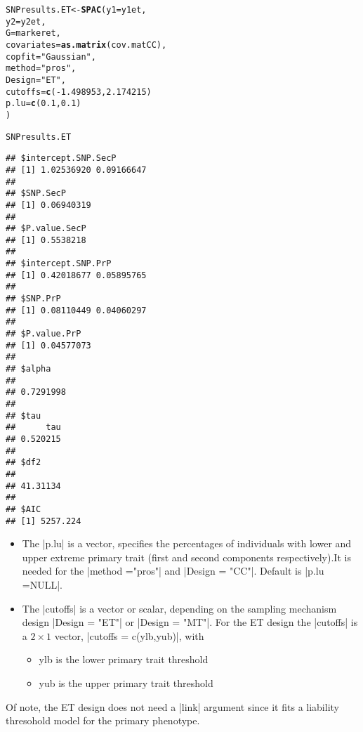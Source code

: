 \documentclass{article}\usepackage[]{graphicx}\usepackage[]{color}
\makeatletter
\newcommand{\hlnum}[1]{\textcolor[rgb]{0.686,0.059,0.569}{#1}}%
\newcommand{\hlstr}[1]{\textcolor[rgb]{0.192,0.494,0.8}{#1}}%
\newcommand{\hlopt}[1]{\textcolor[rgb]{0,0,0}{#1}}%
\newcommand{\hlstd}[1]{\textcolor[rgb]{0.345,0.345,0.345}{#1}}%
\newcommand{\hlkwb}[1]{\textcolor[rgb]{0.69,0.353,0.396}{#1}}%
\newcommand{\hlkwc}[1]{\textcolor[rgb]{0.333,0.667,0.333}{#1}}%
\newcommand{\hlkwd}[1]{\textcolor[rgb]{0.737,0.353,0.396}{\textbf{#1}}}%
\newenvironment{kframe}{%
 \def\at@end@of@kframe{}%
 \ifinner\ifhmode%
  \def\at@end@of@kframe{\end{minipage}}%
  \begin{minipage}{\columnwidth}%
 \fi\fi%
 \def\FrameCommand##1{\hskip\@totalleftmargin \hskip-\fboxsep
 \colorbox{shadecolor}{##1}\hskip-\fboxsep
     \hskip-\linewidth \hskip-\@totalleftmargin \hskip\columnwidth}%
 \MakeFramed {\advance\hsize-\width
   \@totalleftmargin\z@ \linewidth\hsize
   \@setminipage}}%
 {\par\unskip\endMakeFramed%
 \at@end@of@kframe}
\newenvironment{knitrout}{}{} %
\makeatother
\begin{document}
\begin{knitrout}
\color{fgcolor}\begin{kframe}
\begin{alltt}
\hlstd{SNPresults.ET} \hlkwb{<-} \hlkwd{SPAC}\hlstd{(}\hlkwc{y1} \hlstd{= y1et,}
                   \hlkwc{y2} \hlstd{= y2et,}
                   \hlkwc{G} \hlstd{= markeret,}
                   \hlkwc{covariates} \hlstd{=} \hlkwd{as.matrix}\hlstd{(cov.matCC),}
                   \hlkwc{copfit} \hlstd{=} \hlstr{"Gaussian"}\hlstd{,}
                   \hlkwc{method} \hlstd{=} \hlstr{"pros"}\hlstd{,}
                   \hlkwc{Design} \hlstd{=} \hlstr{"ET"}\hlstd{,}
                   \hlkwc{cutoffs} \hlstd{=} \hlkwd{c}\hlstd{(}\hlopt{-}\hlnum{1.498953}\hlstd{,}\hlnum{2.174215}\hlstd{)}
                   \hlkwc{p.lu} \hlstd{=} \hlkwd{c}\hlstd{(}\hlnum{0.1}\hlstd{,}\hlnum{0.1}\hlstd{)}
                   \hlstd{)}
\end{alltt}


{\ttfamily\noindent\itshape\color{messagecolor}{\#\# Starting association analysis of the SNP...}}\begin{alltt}
\hlstd{SNPresults.ET}
\end{alltt}
\begin{verbatim}
## $intercept.SNP.SecP
## [1] 1.02536920 0.09166647
## 
## $SNP.SecP
## [1] 0.06940319
## 
## $P.value.SecP
## [1] 0.5538218
## 
## $intercept.SNP.PrP
## [1] 0.42018677 0.05895765
## 
## $SNP.PrP
## [1] 0.08110449 0.04060297
## 
## $P.value.PrP
## [1] 0.04577073
## 
## $alpha
##           
## 0.7291998 
## 
## $tau
##      tau 
## 0.520215 
## 
## $df2
##          
## 41.31134 
## 
## $AIC
## [1] 5257.224
\end{verbatim}
\end{kframe}
\end{knitrout}

\begin{itemize}
 \item  The |p.lu| is a vector, specifies the percentages of individuals with lower and upper extreme primary trait (first and second
 components respectively).It is needed for the |method ="pros"| and |Design = "CC"|. Default is |p.lu =NULL|.
\item The |cutoffs| is a vector or scalar, depending on the sampling mechanism design |Design = "ET"| or  |Design = "MT"|. For the ET design the |cutoffs| is a $2\times 1$ vector, |cutoffs = c(ylb,yub)|, with
\begin{itemize}
\item ylb is the lower primary trait threshold
\item yub is the upper primary trait threshold
\end{itemize}
\end{itemize}
Of note, the ET design does not need a |link| argument since it fits a liability thresohold model for the primary phenotype.
\end{document}
